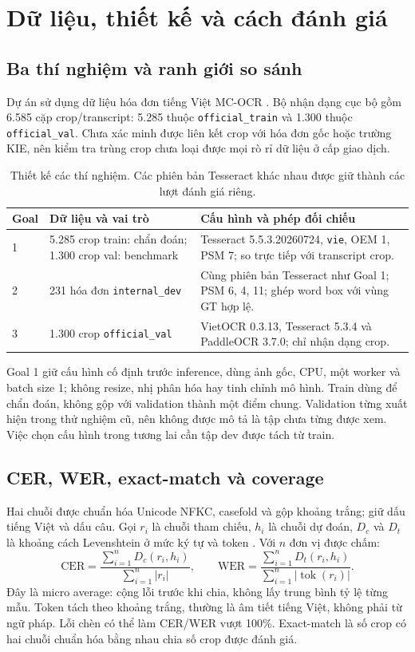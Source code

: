 \documentclass[11pt,a4paper]{article}
\begin{document}
\clearpage
\section{Dữ liệu, thiết kế và cách đánh giá}
\subsection{Ba thí nghiệm và ranh giới so sánh}
Dự án sử dụng dữ liệu hóa đơn tiếng Việt MC-OCR \cite{mcocr}. Bộ nhận dạng cục bộ gồm 6.585 cặp crop/transcript: 5.285 thuộc \texttt{official\_train} và 1.300 thuộc \texttt{official\_val}. Chưa xác minh được liên kết crop với hóa đơn gốc hoặc trường KIE, nên kiểm tra trùng crop chưa loại được mọi rò rỉ dữ liệu ở cấp giao dịch.

\begin{table}[H]
\caption{Thiết kế các thí nghiệm. Các phiên bản Tesseract khác nhau được giữ thành các lượt đánh giá riêng.}
\begin{tabularx}{\linewidth}{@{}P{18mm}P{43mm}Y@{}}
\toprule
\textbf{Goal} & \textbf{Dữ liệu và vai trò} & \textbf{Cấu hình và phép đối chiếu}\\ & 5.285 crop train: chẩn đoán; 1.300 crop val: benchmark & Tesseract 5.5.3.20260724, \texttt{vie}, OEM 1, PSM 7; so trực tiếp với transcript crop.\\
2 & 231 hóa đơn \texttt{internal\_dev} & Cùng phiên bản Tesseract như Goal 1; PSM 6, 4, 11; ghép word box với vùng GT hợp lệ.\\
3 & 1.300 crop \texttt{official\_val} & VietOCR 0.3.13, Tesseract 5.3.4 và PaddleOCR 3.7.0; chỉ nhận dạng crop.\\
\bottomrule
\end{tabularx}
\end{table}

Goal 1 giữ cấu hình cố định trước inference, dùng ảnh gốc, CPU, một worker và batch size 1; không resize, nhị phân hóa hay tinh chỉnh mô hình. Train dùng để chẩn đoán, không gộp với validation thành một điểm chung. Validation từng xuất hiện trong thử nghiệm cũ, nên không được mô tả là tập chưa từng được xem. Việc chọn cấu hình trong tương lai cần tập dev được tách từ train.

\subsection{CER, WER, exact-match và coverage}
Hai chuỗi được chuẩn hóa Unicode NFKC, casefold và gộp khoảng trắng; giữ dấu tiếng Việt và dấu câu. Gọi $r_i$ là chuỗi tham chiếu, $h_i$ là chuỗi dự đoán, $D_c$ và $D_t$ là khoảng cách Levenshtein ở mức ký tự và token \cite{jiwer}. Với $n$ đơn vị được chấm:
\begin{equation}
\mathrm{CER}=\frac{\sum_{i=1}^{n}D_c(r_i,h_i)}{\sum_{i=1}^{n}|r_i|},\qquad
\mathrm{WER}=\frac{\sum_{i=1}^{n}D_t(r_i,h_i)}{\sum_{i=1}^{n}|\operatorname{tok}(r_i)|}.
\end{equation}
Đây là micro average: cộng lỗi trước khi chia, không lấy trung bình tỷ lệ từng mẫu. Token tách theo khoảng trắng, thường là âm tiết tiếng Việt, không phải từ ngữ pháp. Lỗi chèn có thể làm CER/WER vượt 100\%. Exact-match là số crop có hai chuỗi chuẩn hóa bằng nhau chia số crop được đánh giá.
\end{document}
